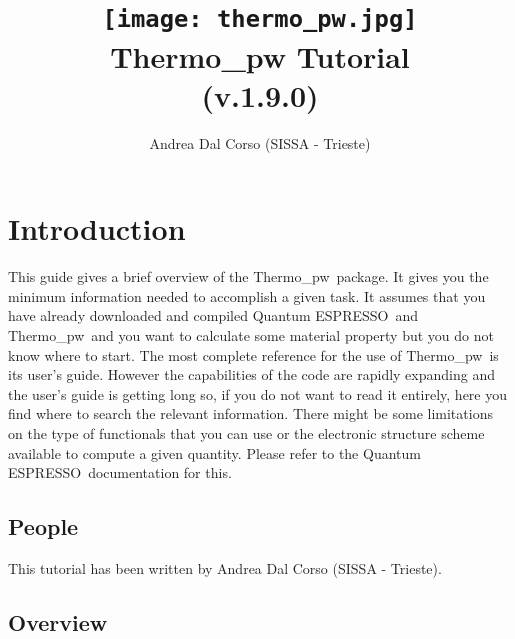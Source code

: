 \documentclass[12pt,a4paper,twoside]{report}
\def\version{1.9.0}
\def\qe{{\sc Quantum ESPRESSO}}
\def\thermo{{\sc Thermo}\_{\sc pw}}
\begin{document}
 

\author{Andrea Dal Corso (SISSA - Trieste)}
\date{}

\title{
  \texttt{[image: thermo\_pw.jpg]} \\
  \vspace{3truecm}
  \Huge \color{dark-blue} {\sc Thermo}\_{\sc pw} Tutorial \\ (v.\version)
}

\maketitle

\newpage

\tableofcontents

\newpage

{\color{dark-blue}\chapter*{Introduction}}
\color{black}

This guide gives a brief overview of the \thermo\ package. 
It gives you the minimum information needed to accomplish a given task.
It assumes that you have already downloaded and compiled \qe\ and \thermo\  
and you want to calculate some material property but you do not know where 
to start. 
The most complete reference for the use of \thermo\ is its user's guide.
However the capabilities of the code are rapidly expanding and the 
user's guide is getting long so, if you do not want
to read it entirely, here you find where to search the relevant information. 
There might be some limitations on the type of functionals that you can use 
or the electronic structure scheme available to compute a given quantity.
Please refer to the \qe\ documentation for this.

\newpage

{\color{coral}\section{People}}
\color{black}
This tutorial has been written by Andrea Dal Corso (SISSA - Trieste). 

\newpage

{\color{coral}\section{Overview}}
\color{black}
\end{document}
